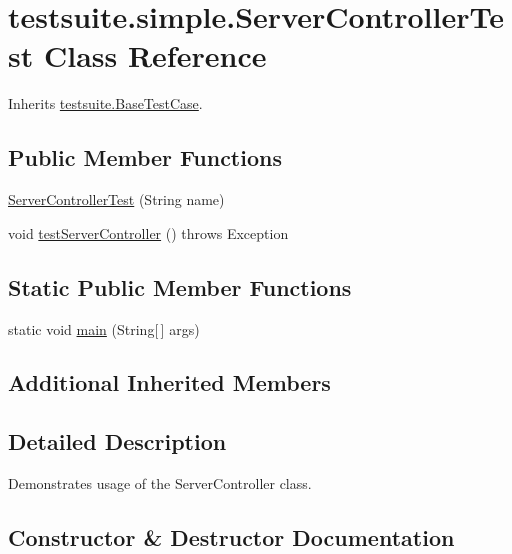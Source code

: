 \hypertarget{classtestsuite_1_1simple_1_1_server_controller_test}{}\section{testsuite.\+simple.\+Server\+Controller\+Test Class Reference}
\label{classtestsuite_1_1simple_1_1_server_controller_test}


Inherits \mbox{\hyperlink{classtestsuite_1_1_base_test_case}{testsuite.\+Base\+Test\+Case}}.

\subsection*{Public Member Functions}
\begin{DoxyCompactItemize}
\item 
\mbox{\hyperlink{classtestsuite_1_1simple_1_1_server_controller_test_aed48ef46008c20609af703e32af46073}{Server\+Controller\+Test}} (String name)
\item 
void \mbox{\hyperlink{classtestsuite_1_1simple_1_1_server_controller_test_a8a596dbd3bd3be8d4e90da85076c393e}{test\+Server\+Controller}} ()  throws Exception 
\end{DoxyCompactItemize}
\subsection*{Static Public Member Functions}
\begin{DoxyCompactItemize}
\item 
static void \mbox{\hyperlink{classtestsuite_1_1simple_1_1_server_controller_test_a8aeb6ae4588ab63220794d7ead41ce35}{main}} (String\mbox{[}$\,$\mbox{]} args)
\end{DoxyCompactItemize}
\subsection*{Additional Inherited Members}


\subsection{Detailed Description}
Demonstrates usage of the Server\+Controller class. 

\subsection{Constructor \& Destructor Documentation}
\mbox{\label{classtestsuite_1_1simple_1_1_server_controller_test_aed48ef46008c20609af703e32af46073}} 
